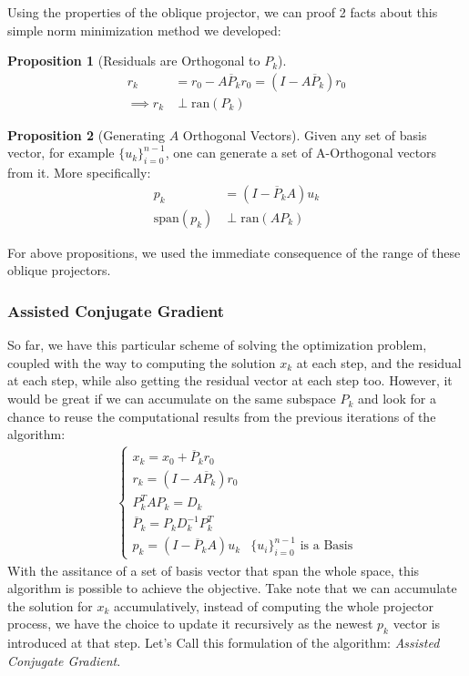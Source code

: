 \documentclass[]{article}
\theoremstyle{definition}
\newtheorem{prop}{Proposition}
\begin{document}
            Using the properties of the oblique projector, we can proof 2 facts about this simple norm minimization method we developed: 
            \begin{prop}[Residuals are Orthogonal to $P_k$]
                \begin{align}
                    r_k &= r_0 - A\overline{P}_kr_0 = (I - A\overline{P}_k)r_0
                    \\
                    \implies 
                    r_k &\perp \text{ran}(P_k)
                \end{align}
            \end{prop}
            \begin{prop}[Generating $A$ Orthogonal Vectors]
                Given any set of basis vector, for example $\{u_k\}_{i = 0}^{n - 1}$, one can generate a set of A-Orthogonal vectors from it. More specifically: 
                \begin{align}
                    p_k &= (I - \overline{P}_kA)u_k
                    \\
                    \text{span}(p_k) &\perp \text{ran}(AP_k)
                \end{align}
            \end{prop}
            For above propositions, we used the immediate consequence of the range of these oblique projectors. 
        \subsubsection{Assisted Conjugate Gradient}
            So far, we have this particular scheme of solving the optimization problem, coupled with the way to computing the solution $x_k$ at each step, and the residual at each step, while also getting the residual vector at each step too. However, it would be great if we can accumulate on the same subspace $P_k$ and look for a chance to reuse the computational results from the previous iterations of the algorithm: 
            \begin{align}
                \begin{cases}
                    x_k = x_0 + \overline{P}_k r_0
                    \\
                    r_k = (I - A\overline{P}_k) r_0
                    \\
                    P^T_kAP_k = D_k
                    \\
                    \overline{P}_k = P_kD^{-1}_kP_k^T
                    \\
                    p_k = (I - \overline{P}_kA)u_k & \{u_i\}_{i = 0}^{n - 1} \text{ is a Basis}
                \end{cases}
            \end{align}
            With the assitance of a set of basis vector that span the whole space, this algorithm is possible to achieve the objective. Take note that we can accumulate the solution for $x_k$ accumulatively, instead of computing the whole projector process, we have the choice to update it recursively as the newest $p_k$ vector is introduced at that step. Let's Call this formulation of the algorithm: \textit{Assisted Conjugate Gradient}. 
\end{document}
